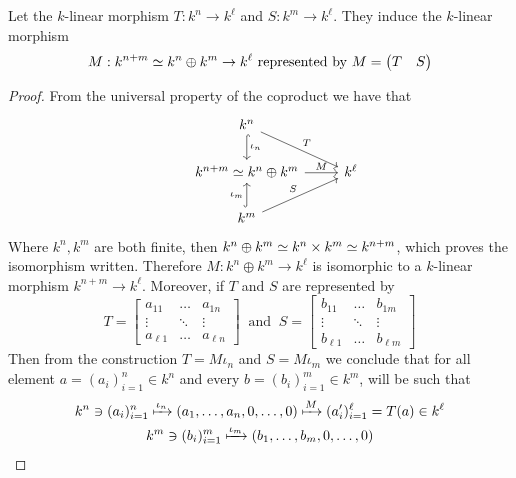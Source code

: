 \begin{proposition}
    Let the \(k\)-linear morphism \(T : k^n \to k^\ell\) and \(S : k^m \to
    k^\ell\). They induce the \(k\)-linear morphism
    \[
        M : k^{n+m} \simeq k^n \oplus k^m \to k^\ell \text{ represented by }
        M = \begin{pmatrix} T &S \end{pmatrix}
    \]
\end{proposition}

\begin{proof}
    From the universal property of the coproduct we have that
    \[
        \begin{tikzcd}
            &k^n \ar[hook, "\iota_n", d]  \ar[dr, "T"]& \\
            & k^{n+m} \iso k^n \oplus k^m \ar[r, "M"] &k^\ell \\
            &k^m \ar[hook, "\iota_m", u] \ar[ur, "S"] &
        \end{tikzcd}
    \]
    Where \(k^n, k^m\) are both finite, then \(k^n \oplus k^m \simeq k^n \times k^m
    \simeq k^{n+m}\), which proves the isomorphism written. Therefore \(M : k^n
    \oplus k^m \to k^\ell\) is isomorphic to a \(k\)-linear morphism \(k^{n+m}
    \to k^\ell\). Moreover, if \(T\) and \(S\) are represented by
    \[
        T =
        \begin{bmatrix}
            a_{11}     & \dots  & a_{1n}     \\
            \vdots     & \ddots & \vdots     \\
            a_{\ell 1} & \dots  & a_{\ell n}
        \end{bmatrix}
        \ \text{ and }\
        S =
        \begin{bmatrix}
            b_{11}     & \dots  & b_{1m}     \\
            \vdots     & \ddots & \vdots     \\
            b_{\ell 1} & \dots  & b_{\ell m}
        \end{bmatrix}
    \]
    Then from the construction \(T = M  \iota_n\) and \(S = M
    \iota_m\) we conclude that for all element \(a = (a_i)_{i=1}^n \in k^n\) and
    every \(b = (b_i)_{i=1}^m \in k^m\), will be such that
    \begin{gather*}
        k^n \ni (a_i)_{i=1}^n \xmapsto{\iota_n} (a_1, \dots, a_n, 0, \dots, 0)
        \xmapsto{M} (a'_i)_{i=1}^\ell = T(a) \in k^\ell
        \\
        k^m \ni (b_i)_{i=1}^m \xmapsto{\iota_m} (b_1, \dots, b_m, 0, \dots, 0)

\end{gather*}
\end{proof}
